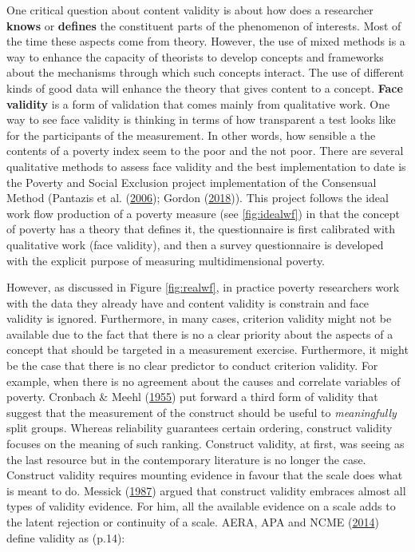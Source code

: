 \documentclass[]{book}
\begin{document}
One critical question about content validity is about how does a researcher \textbf{knows} or \textbf{defines} the constituent parts of the phenomenon of interests. Most of the time these aspects come from theory. However, the use of mixed methods is a way to enhance the capacity of theorists to develop concepts and frameworks about the mechanisms through which such concepts interact. The use of different kinds of good data will enhance the theory that gives content to a concept. \textbf{Face validity} is a form of validation that comes mainly from qualitative work. One way to see face validity is thinking in terms of how transparent a test looks like for the participants of the measurement. In other words, how sensible a the contents of a poverty index seem to the poor and the not poor. There are several qualitative methods to assess face validity and the best implementation to date is the Poverty and Social Exclusion project implementation of the Consensual Method (Pantazis et al. (\protect\hyperlink{ref-Pantazis2006a}{2006}); Gordon (\protect\hyperlink{ref-Gordon2018}{2018})). This project follows the ideal work flow production of a poverty measure (see \ref{fig:idealwf}) in that the concept of poverty has a theory that defines it, the questionnaire is first calibrated with qualitative work (face validity), and then a survey questionnaire is developed with the explicit purpose of measuring multidimensional poverty.

However, as discussed in Figure \ref{fig:realwf}, in practice poverty researchers work with the data they already have and content validity is constrain and face validity is ignored. Furthermore, in many cases, criterion validity might not be available due to the fact that there is no a clear priority about the aspects of a concept that should be targeted in a measurement exercise. Furthermore, it might be the case that there is no clear predictor to conduct criterion validity. For example, when there is no agreement about the causes and correlate variables of poverty. Cronbach \& Meehl (\protect\hyperlink{ref-Cronbach1955}{1955}) put forward a third form of validity that suggest that the measurement of the construct should be useful to \emph{meaningfully} split groups. Whereas reliability guarantees certain ordering, construct validity focuses on the meaning of such ranking. Construct validity, at first, was seeing as the last resource but in the contemporary literature is no longer the case. Construct validity requires mounting evidence in favour that the scale does what is meant to do. Messick (\protect\hyperlink{ref-Messick1987}{1987}) argued that construct validity embraces almost all types of validity evidence. For him, all the available evidence on a scale adds to the latent rejection or continuity of a scale. AERA, APA and NCME (\protect\hyperlink{ref-AERA2014}{2014}) define validity as (p.14):
\end{document}
